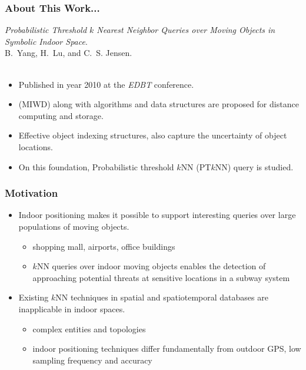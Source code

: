 \begin{frame}
\frametitle{About This Work...}

\emph{Probabilistic Threshold $k$ Nearest Neighbor Queries over Moving Objects in Symbolic Indoor Space}.~\cite{DBLP:conf/edbt/YangLJ10} \\
B.~Yang, H.~Lu, and C.~S. Jensen.\\~\\

\begin{itemize}
  \item Published in year 2010 at the \emph{EDBT} conference.
  \item {}(MIWD) along with algorithms and data structures are proposed for distance computing and storage.
  \item Effective object indexing structures, also capture the uncertainty of object locations.
  \item On this foundation, Probabilistic threshold $k$NN (PT$k$NN) query is studied.
\end{itemize}

\end{frame}

\begin{frame}
\frametitle{Motivation}

\begin{itemize}
  \item Indoor positioning makes it possible to support interesting queries over large populations of moving objects.\cite{jensen2010indoor}
    \begin{itemize}
      \item shopping mall, airports, office buildings
      \item $k$NN queries over indoor moving objects enables the detection of approaching potential threats at sensitive locations in a subway system
    \end{itemize}

  \item Existing $k$NN techniques in spatial and spatiotemporal databases are inapplicable in indoor spaces.
    \begin{itemize}
      \item complex entities and topologies
      \item indoor positioning techniques differ fundamentally from outdoor GPS, low sampling frequency and accuracy
    \end{itemize}
\end{itemize}

\end{frame}


